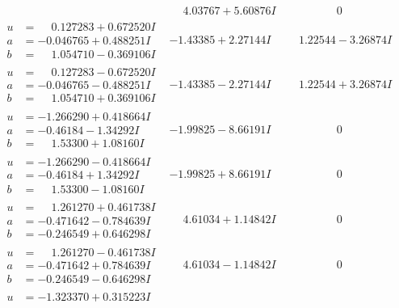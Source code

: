 \documentclass[1p]{elsarticle_modified}
\theoremstyle{definition}
\begin{document}
$$\begin{array}{c|c|c}
 & \phantom{-}4.03767 + 5.60876 I & \phantom{-0.000000 } 0 \\ \hline\begin{aligned}
u &= \phantom{-}0.127283 + 0.672520 I \\
a &= -0.046765 + 0.488251 I \\
b &= \phantom{-}1.054710 - 0.369106 I\end{aligned}
 & -1.43385 + 2.27144 I & \phantom{-}1.22544 - 3.26874 I \\ \hline\begin{aligned}
u &= \phantom{-}0.127283 - 0.672520 I \\
a &= -0.046765 - 0.488251 I \\
b &= \phantom{-}1.054710 + 0.369106 I\end{aligned}
 & -1.43385 - 2.27144 I & \phantom{-}1.22544 + 3.26874 I \\ \hline\begin{aligned}
u &= -1.266290 + 0.418664 I \\
a &= -0.46184 - 1.34292 I \\
b &= \phantom{-}1.53300 + 1.08160 I\end{aligned}
 & -1.99825 - 8.66191 I & \phantom{-0.000000 } 0 \\ \hline\begin{aligned}
u &= -1.266290 - 0.418664 I \\
a &= -0.46184 + 1.34292 I \\
b &= \phantom{-}1.53300 - 1.08160 I\end{aligned}
 & -1.99825 + 8.66191 I & \phantom{-0.000000 } 0 \\ \hline\begin{aligned}
u &= \phantom{-}1.261270 + 0.461738 I \\
a &= -0.471642 - 0.784639 I \\
b &= -0.246549 + 0.646298 I\end{aligned}
 & \phantom{-}4.61034 + 1.14842 I & \phantom{-0.000000 } 0 \\ \hline\begin{aligned}
u &= \phantom{-}1.261270 - 0.461738 I \\
a &= -0.471642 + 0.784639 I \\
b &= -0.246549 - 0.646298 I\end{aligned}
 & \phantom{-}4.61034 - 1.14842 I & \phantom{-0.000000 } 0 \\ \hline\begin{aligned}
u &= -1.323370 + 0.315223 I \\

\end{aligned}
\end{array}$$
\end{document}
